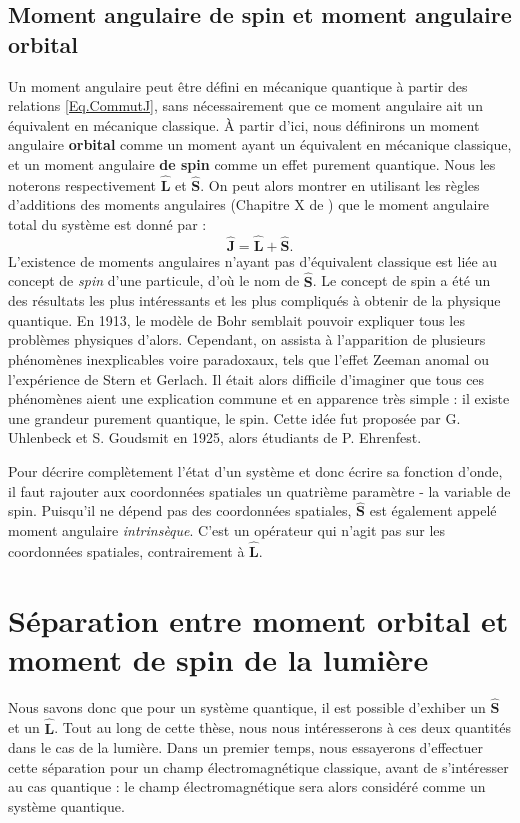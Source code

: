 \section{Moment angulaire de spin et moment angulaire orbital}
Un moment angulaire peut être défini en mécanique quantique à partir des relations \ref{Eq.CommutJ}, sans nécessairement que ce moment angulaire ait un équivalent en mécanique classique. \`A partir d'ici, nous définirons un moment angulaire \textbf{orbital} comme un moment ayant un équivalent en mécanique classique, et un moment angulaire \textbf{de spin} comme un effet purement quantique. Nous les noterons respectivement $\bm{\hat{L}}$ et $\bm{\hat{S}}$. On peut alors montrer en utilisant les règles d'additions des moments angulaires (Chapitre X de ) que le moment angulaire total du système est donné par :
\begin{equation}
\bm{\hat{J}}=\bm{\hat{L}}+\bm{\hat{S}}.
\label{Eq.JegalLplusS}
\end{equation}
L'existence de moments angulaires n'ayant pas d'équivalent classique est liée au concept de \textit{spin} d'une particule, d'où le nom de $\bm{\hat{S}}$. Le concept de spin a été un des résultats les plus intéressants et les plus compliqués à obtenir de la physique quantique. En 1913, le modèle de Bohr semblait pouvoir expliquer tous les problèmes physiques d'alors. Cependant, on assista à l'apparition de plusieurs phénomènes inexplicables voire paradoxaux, tels que l'effet Zeeman anomal ou l'expérience de Stern et Gerlach. Il était alors difficile d'imaginer que tous ces phénomènes aient une explication commune et en apparence très simple : il existe une grandeur purement quantique, le spin. Cette idée fut proposée par G. Uhlenbeck et S. Goudsmit en 1925, alors étudiants de P. Ehrenfest. 

Pour décrire complètement l'état d'un système et donc écrire sa fonction d'onde, il faut rajouter aux coordonnées spatiales un quatrième paramètre - la variable de spin. Puisqu'il ne dépend pas des coordonnées spatiales, $\bm{\hat{S}}$ est également appelé moment angulaire \textit{intrinsèque}. C'est un opérateur qui n'agit pas sur les coordonnées spatiales, contrairement à $\bm{\hat{L}}$. 

\chapter{Séparation entre moment orbital et moment de spin de la lumière}
Nous savons donc que pour un système quantique, il est possible d'exhiber un $\bm{\hat{S}}$ et un $\bm{\hat{L}}$. Tout au long de cette thèse, nous nous intéresserons à ces deux quantités dans le cas de la lumière. Dans un premier temps, nous essayerons d'effectuer cette séparation pour un champ électromagnétique classique, avant de s'intéresser au cas quantique : le champ électromagnétique sera alors considéré comme un système quantique.

